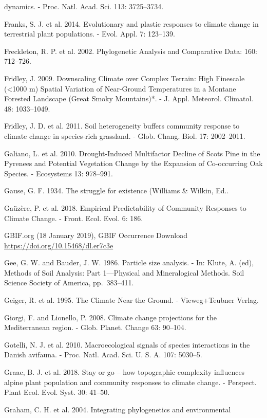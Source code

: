 \documentclass[11pt,twoside]{reedthesis}
\begin{document}
dynamics. - Proc. Natl. Acad. Sci. 113: 3725--3734.\par
Franks, S. J. et al. 2014. Evolutionary and plastic responses to climate
change in terrestrial plant populations. - Evol. Appl. 7: 123--139.\par
Freckleton, R. P. et al. 2002. Phylogenetic Analysis and Comparative
Data: 160: 712--726.\par
Fridley, J. 2009. Downscaling Climate over Complex Terrain: High
Finescale (\textless{}1000 m) Spatial Variation of Near-Ground
Temperatures in a Montane Forested Landscape (Great Smoky Mountains)*. -
J. Appl. Meteorol. Climatol. 48: 1033--1049.\par
Fridley, J. D. et al. 2011. Soil heterogeneity buffers community
response to climate change in species-rich grassland. - Glob. Chang.
Biol. 17: 2002--2011.\par
Galiano, L. et al. 2010. Drought-Induced Multifactor Decline of Scots
Pine in the Pyrenees and Potential Vegetation Change by the Expansion of
Co-occurring Oak Species. - Ecosystems 13: 978--991.\par
Gause, G. F. 1934. The struggle for existence (Williams \& Wilkin,
Ed..\par
Gaüzère, P. et al. 2018. Empirical Predictability of Community Responses
to Climate Change. - Front. Ecol. Evol. 6: 186.\par
GBIF.org (18 January 2019), GBIF Occurrence Download
\url{https://doi.org/10.15468/dl.er7c3e} \par
Gee, G. W. and Bauder, J. W. 1986. Particle size analysis. - In: Klute,
A. (ed), Methods of Soil Analysis: Part 1---Physical and Mineralogical
Methods. Soil Science Society of America, pp.~383--411.\par
Geiger, R. et al. 1995. The Climate Near the Ground. - Vieweg+Teubner
Verlag.\par
Giorgi, F. and Lionello, P. 2008. Climate change projections for the
Mediterranean region. - Glob. Planet. Change 63: 90--104.\par
Gotelli, N. J. et al. 2010. Macroecological signals of species
interactions in the Danish avifauna. - Proc. Natl. Acad. Sci. U. S. A.
107: 5030--5.\par
Graae, B. J. et al. 2018. Stay or go -- how topographic complexity
influences alpine plant population and community responses to climate
change. - Perspect. Plant Ecol. Evol. Syst. 30: 41--50.\par
Graham, C. H. et al. 2004. Integrating phylogenetics and environmental
\end{document}
